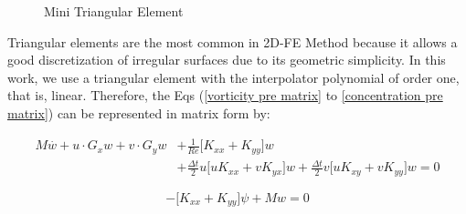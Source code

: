 \begin{figure}[H]
\begin{center}
\end{center}
\caption{Mini Triangular Element}
\label{elemento triangular mini}
\end{figure}






\medskip
Triangular elements are the most common in 2D-FE Method because 
it allows a good discretization of irregular surfaces 
due to its geometric simplicity. In this work, we use a triangular 
element with the interpolator polynomial of order one, that is, linear.
Therefore, 
the Eqs (\ref{vorticity pre matrix} to \ref{concentration pre matrix})
can be represented in matrix form by:

\begin{equation}
\begin{aligned}
 M \overset{.}{w} + u \cdot G_x w  + v \cdot G_y w & + \frac{1}{\textit{Re}} \Big[ K_{xx} + K_{yy} \Big] w
 \\[5pt]
 & + \frac{\Delta t}{2} u \Big[ u K_{xx} + v K_{yx} \Big] w 
 + \frac{\Delta t}{2} v \Big[ u K_{xy} + v K_{yy} \Big] w 
 = 0 \label{vorticity matrix}
\end{aligned}
\end{equation}

\begin{equation}
 - \Big[ K_{xx} + K_{yy} \Big] \psi + Mw = 0
\end{equation}

